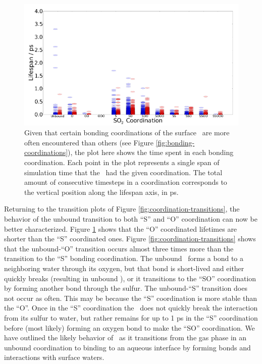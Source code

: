 \begin{figure}[h!]
	\begin{center}
		\includegraphics[scale=1.0]{images/coordinations/coordination-lifespans.png}
		\caption{Given that certain bonding coordinations of the surface \suldiox~are more often encountered than others (see Figure \ref{fig:bonding-coordinations}), the plot here shows the time spent in each bonding coordination. Each point in the plot represents a single span of simulation time that the \suldiox~had the given coordination. The total amount of consecutive timesteps in a coordination corresponds to the vertical position along the lifespan axis, in ps.}
		\label{fig:coordination-lifespans}
	\end{center}
\end{figure}

Returning to the transition plots of Figure \ref{fig:coordination-transitions}, the behavior of the unbound transition to both ``S'' and ``O'' coordination can now be better characterized. Figure \ref{fig:coordination-lifespans} shows that the ``O'' coordinated lifetimes are shorter than the ``S'' coordinated ones. Figure \ref{fig:coordination-transitions} shows that the unbound-``O'' transition occurs almost three times more than the transition to the ``S'' bonding coordination. The unbound \suldiox~forms a bond to a neighboring water through its oxygen, but that bond is short-lived and either quickly breaks (resulting in unbound \suldiox), or it transitions to the ``SO'' coordination by forming another bond through the sulfur. The unbound-``S'' transition does not occur as often. This may be because the ``S'' coordination is more stable than the ``O''. Once in the ``S'' coordination the \suldiox~does not quickly break the interaction from its sulfur to water, but rather remains for up to 1 ps in the ``S'' coordination before (most likely) forming an oxygen bond to make the ``SO'' coordination. We have outlined the likely behavior of \suldiox~as it transitions from the gas phase in an unbound coordination to binding to an aqueous interface by forming bonds and interactions with surface waters.

